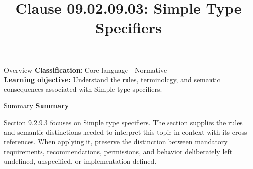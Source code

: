 \documentclass[10pt,letterpaper]{article}
\title{Clause 09.02.09.03: Simple Type Specifiers}
\author{}
\date{}
\begin{document}
\maketitle
\begin{CornellOverviewBox}{Overview}
\textbf{Classification:} Core language - Normative\\[2pt]
\textbf{Learning objective:} Understand the rules, terminology, and semantic consequences associated with Simple type specifiers.
\end{CornellOverviewBox}\begin{CornellSummaryBox}{Summary}
{\sffamily\bfseries\color{Accent} Summary}\par\vspace{3pt}Section 9.2.9.3 focuses on Simple type specifiers. The section supplies the rules and semantic distinctions needed to interpret this topic in context with its cross-references. When applying it, preserve the distinction between mandatory requirements, recommendations, permissions, and behavior deliberately left undefined, unspecified, or implementation-defined.
\end{CornellSummaryBox}
\end{document}

